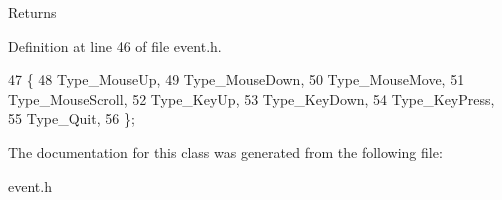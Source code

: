 \begin{DoxyReturn}{Returns}

\end{DoxyReturn}


Definition at line 46 of file event.\+h.


\begin{DoxyCode}
47         \{
48             Type\_MouseUp,
49             Type\_MouseDown,
50             Type\_MouseMove,
51             Type\_MouseScroll,
52             Type\_KeyUp,
53             Type\_KeyDown,
54             Type\_KeyPress,
55             Type\_Quit,
56         \};
\end{DoxyCode}


The documentation for this class was generated from the following file\+:\begin{DoxyCompactItemize}
\item 
event.\+h\end{DoxyCompactItemize}
